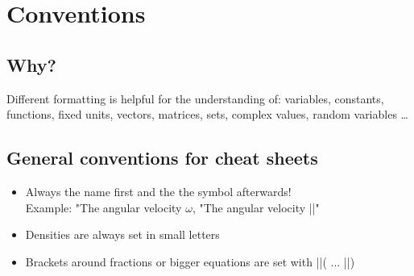 \documentclass[english]{latex4ei_fs}
\begin{document}


\section{Conventions}

\begin{sectionbox}
	\subsection*{Why?}

	Different formatting is helpful for the understanding of: variables, constants, functions, fixed units, vectors, matrices, sets, complex values, random variables \ldots
\end{sectionbox}

\begin{sectionbox}
	\subsection{General conventions for cheat sheets}
	\begin{itemize}
		\item Always the name first and the the symbol afterwards! \\ Example: "The angular velocity $\omega$, "The angular velocity \code|\omega|"
		\item Densities are always set in small letters
		\item Brackets around fractions or bigger equations are set with \code|\left|( ... \code|\right|)
	\end{itemize}
\end{sectionbox}
\end{document}
